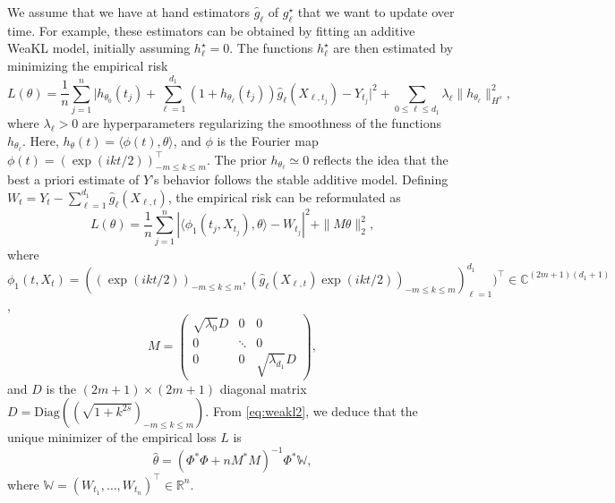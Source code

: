 We assume that we have at hand estimators $\hat g_\ell$ of $g_\ell^\star$ that we want to update over time. For example, these estimators can be obtained by fitting an additive WeaKL model, initially assuming $h_\ell^\star = 0$. The functions $h_\ell^\star$ are then estimated by minimizing the empirical risk
\begin{equation}
    L(\theta) = \frac{1}{n}\sum_{j=1}^n \Big|h_{\theta_0}(t_j) + \sum_{\ell=1}^{d_1} (1+h_{\theta_\ell}(t_j)) \hat g_\ell(X_{\ell,t_j})-Y_{t_j}\Big|^2 + \sum_{0\leq \ell \leq d_1} \lambda_\ell\|h_{\theta_\ell}\|_{H^s}^2,
    \label{eq:risk_online}
\end{equation}
where $\lambda_\ell > 0$ are hyperparameters regularizing the smoothness of the functions $h_{\theta_\ell}$. Here, $h_{\theta}(t) = \langle \phi(t), \theta\rangle$, and $\phi$ is the Fourier map $\phi(t) =(\exp(i k t/2))_{-m\leq k \leq m}^\top$. The prior $h_{\theta_\ell} \simeq 0$ reflects the idea that the best a priori estimate of $Y$'s behavior follows the stable additive model. Defining $W_t = Y_t - \sum_{\ell=1}^{d_1}\hat g_\ell(X_{\ell,t})$, the empirical risk can be reformulated as
\begin{equation*}
    L(\theta) = \frac{1}{n}\sum_{j=1}^n |\langle \phi_1(t_j, X_{t_j}), \theta\rangle - W_{t_j}|^2 + \|M \theta\|_2^2,
\end{equation*}
where
$\phi_1(t, X_t) = 
    ((\exp(ik t/2))_{- m\leq k \leq  m},
    (\hat g_\ell(X_{\ell,t})\exp(ik t/2))_{- m\leq k \leq  m})_{\ell=1}^{d_1})^\top \in \mathbb C^{(2m+1)(d_1+1)}$,
\[M = \begin{pmatrix}
        \sqrt{\lambda_0} D& 0  & 0\\
        0 & \ddots&  0\\
        0 & 0& \sqrt{\lambda_{d_1}} D
    \end{pmatrix},\]
and $D$ is the $(2m+1)\times (2m+1)$ diagonal matrix
$D =\mathrm{Diag}((\sqrt{1+k^{2s}})_{-m\leq k\leq m})$.
From \eqref{eq:weakl2}, we deduce that the unique minimizer of the empirical loss $L$ is
\begin{equation}
    \hat \theta  = ({\mathbb{\Phi}} ^\ast {\mathbb{\Phi}} + n  M^\ast M)^{-1}{\mathbb \Phi}^\ast  \mathbb W,
    \label{eq:online}
\end{equation}
where  $\mathbb W = (W_{t_1}, \hdots, W_{t_n})^\top \in \mathbb R^n$. 

